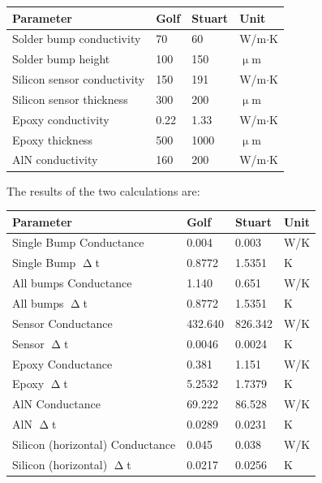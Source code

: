 \documentclass[11pt]{article}
\begin{document}
\begin{center}
  \begin{tabular}{llll}
    \textbf{Parameter}                   & \textbf{Golf}          & \textbf{Stuart}          & \textbf{Unit} \\
    \midrule
    Solder bump conductivity    & 70            & 60              & W/m$\cdot$K    \\
    Solder bump height          & 100           & 150             & $\upmu$m      \\
    Silicon sensor conductivity & 150           & 191             & W/m$\cdot$K    \\
    Silicon sensor thickness    & 300           & 200             & $\upmu$m      \\
    Epoxy conductivity          & 0.22          & 1.33            & W/m$\cdot$K    \\
    Epoxy thickness             & 500           & 1000            & $\upmu$m      \\
    AlN conductivity            & 160           & 200             & W/m$\cdot$K    \\
  \end{tabular}
\end{center}

The results of the two calculations are:

\begin{center}
  \begin{tabular}{llll}
    \textbf{Parameter}               & \textbf{Golf} & \textbf{Stuart} & \textbf{Unit} \\\midrule
    Single Bump Conductance          & 0.004         & 0.003           & W/K           \\
    Single Bump $\upDelta$t          & 0.8772        & 1.5351          & K             \\
    All bumps Conductance            & 1.140         & 0.651           & W/K           \\
    All bumps $\upDelta$t            & 0.8772        & 1.5351          & K             \\
    Sensor Conductance               & 432.640       & 826.342         & W/K           \\
    Sensor $\upDelta$t               & 0.0046        & 0.0024          & K             \\
    Epoxy Conductance                & 0.381         & 1.151           & W/K           \\
    Epoxy $\upDelta$t                & 5.2532        & 1.7379          & K             \\
    AlN Conductance                  & 69.222        & 86.528          & W/K           \\
    AlN $\upDelta$t                  & 0.0289        & 0.0231          & K             \\
    Silicon (horizontal) Conductance & 0.045         & 0.038           & W/K           \\
    Silicon (horizontal) $\upDelta$t & 0.0217        & 0.0256          & K             \\
  \end{tabular}
\end{center}
\end{document}
